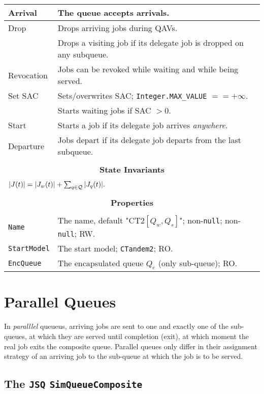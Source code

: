 \begin{tabular}{|l|l|}
	\hline
	Arrival & The queue accepts arrivals. \\
	\hline
	Drop & Drops arriving jobs during QAVs. \\
	& Drops a visiting job if its delegate job is dropped on any subqueue. \\
	\hline
	Revocation & Jobs can be revoked while waiting and while being served. \\
	\hline
	Set SAC & Sets/overwrites SAC; \lstinline|Integer.MAX_VALUE| $== +\infty$. \\
	& Starts waiting jobs if SAC $> 0$. \\
	\hline
	Start & Starts a job if its delegate job arrives {\em anywhere}. \\
	\hline
	Departure & Jobs depart if its delegate job departs from the last subqueue. \\
	\hline
	\multicolumn{2}{|c|}{} \\
	\multicolumn{2}{|c|}{\bf State  Invariants} \\
	\multicolumn{2}{|c|}{} \\
	\hline
	\multicolumn{2}{|l|}{$|J(t)| = |J_{w}(t)| + \sum_{q \in \cal{Q}} |J_{q}(t)|.$} \\
	\hline
	\multicolumn{2}{|c|}{} \\
	\multicolumn{2}{|c|}{\bf Properties} \\
	\multicolumn{2}{|c|}{} \\
	\hline
	\lstinline|Name|       & The name, default "CT2$[Q_{w},Q_{s}]$"; non-\lstinline|null|; non-\lstinline|null|; RW. \\
	\hline
	\lstinline|StartModel| & The start model; \lstinline|CTandem2|; RO. \\
	\hline
	\lstinline|EncQueue|     & The encapsulated queue $Q_{e}$ (only sub-queue); RO. \\
	\hline
\end{tabular}

\section{Parallel Queues}

In {\em paralllel\/} queueus, arriving jobs are sent to one and exactly one of the sub-queues,
at which they are served until completion (exit),
at which moment the real job exits the composite queue. Parallel queues only differ in their assignment strategy of an arriving job to the sub-queue at which the job is to be served.

\subsection{The \lstinline{JSQ} \lstinline{SimQueueComposite}}
\label{sec:JSQ}

